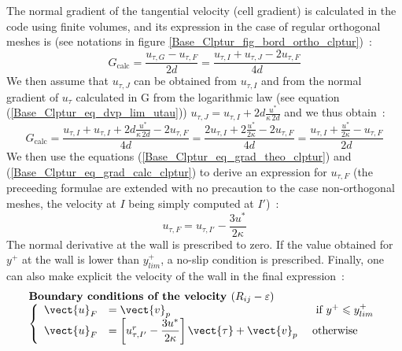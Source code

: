 The normal gradient of the tangential velocity (cell gradient) is
calculated in the code using finite volumes, and its expression in the case 
of regular orthogonal meshes is (see notations in figure
\ref{Base_Clptur_fig_bord_ortho_clptur})~:  
\begin{equation}
G_{\text{calc}}=\displaystyle\frac{u_{\tau,G}-u_{\tau,F}}{2d} =
\displaystyle\frac{u_{\tau,I}+u_{\tau,J}-2u_{\tau,F}}{4d}
\end{equation}
We then assume that $u_{\tau,J}$ can be obtained from $u_{\tau,I}$
and from the normal gradient of $u_{\tau}$ calculated in G
from the logarithmic law (see equation (\ref{Base_Clptur_eq_dvp_lim_utau}))
$u_{\tau,J}=u_{\tau,I}+2d\displaystyle\frac{u^*}{\kappa\, 2d}$ and we thus
obtain~:
\begin{equation}\label{Base_Clptur_eq_grad_calc_clptur}
G_{\text{calc}}=\displaystyle\frac{u_{\tau,I}+u_{\tau,I}+2d\displaystyle\frac{u^*}{\kappa\, 2d}-2u_{\tau,F}}{4d}=
\displaystyle\frac{2u_{\tau,I}+2\displaystyle\frac{u^*}{2\kappa}-2u_{\tau,F}}{4d}=
\displaystyle\frac{u_{\tau,I}+\displaystyle\frac{u^*}{2\kappa}-u_{\tau,F}}{2d}
\end{equation}
We then use the equations (\ref{Base_Clptur_eq_grad_theo_clptur}) and 
(\ref{Base_Clptur_eq_grad_calc_clptur}) to derive an expression for 
$u_{\tau,F}$ (the preceeding
formulae are extended with no precaution to the case non-orthogonal meshes, 
the velocity at $I$ being simply computed at $I'$)~: 
\begin{equation}
u_{\tau,F}= u_{\tau,I'}-\displaystyle\frac{3u^*}{2\kappa }
\end{equation}
The normal derivative at the wall is prescribed to zero.
If the value obtained for $y^+$ at the wall is lower than  $y^+_{lim}$, 
a no-slip condition is prescribed. Finally, one can also 
make explicit the velocity of the wall in the final expression~:
\begin{equation}\label{Base_Clptur_eq_CL_vitesse_rij_clptur}
\begin{array}{l}
\text{\bf Boundary conditions of the velocity }(R_{ij}-\varepsilon)\\
\left\{\begin{array}{lll}
\vect{u}_{F}&=\vect{v}_p& \text{ \ if\ } y^+\leqslant
                           y^+_{lim} \\
\vect{u}_{F}&=\left[u^r_{\tau,I'}-\displaystyle\frac{3u^*}{2\kappa } \right]\vect{\tau} +\vect{v}_p &\text{ otherwise }
\end{array}\right.
\end{array}
\end{equation}


